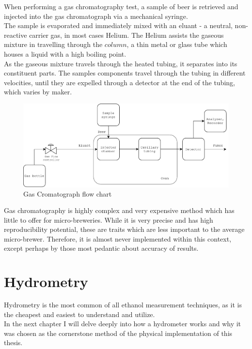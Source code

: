 \documentclass[twoside]{ctuthesis}
\theoremstyle{plain}
\theoremstyle{definition}
\theoremstyle{note}
\begin{document}
When performing a gas chromatography test, a sample of beer is retrieved and injected into the gas chromatograph via a mechanical syringe. \\
The sample is evaporated and immediately mixed with an eluant - a neutral, non-reactive carrier gas, in most cases Helium. The Helium assists the gaseous mixture in travelling through the $column$, a thin metal or glass tube which houses a liquid with a high boiling point. \\
As the gaseous mixture travels through the heated tubing, it separates into its constituent parts. The samples components travel through the tubing in different velocities, until they are expelled through a detector at the end of the tubing, which varies by maker.

\begin{figure}[H]
	\centering
	\includegraphics[width = \textwidth]{Gas_Chromatograph_PDF}
	\caption{Gas Cromatograph flow chart}
\end{figure}

Gas chromatography is highly complex and very expensive method which has little to offer for micro-breweries. While it is very precise and has high reproducibility potential, these are traits which are less important to the average micro-brewer. Therefore, it is almost never implemented within this context, except perhaps by those most pedantic about accuracy of results.

\newpage

\section{Hydrometry}
Hydrometry is the most common of all ethanol measurement techniques, as it is the cheapest and easiest to understand and utilize.\\
In the next chapter I will delve deeply into how a hydrometer works and why it was chosen as the cornerstone method of the physical implementation of this thesis.
\end{document}
